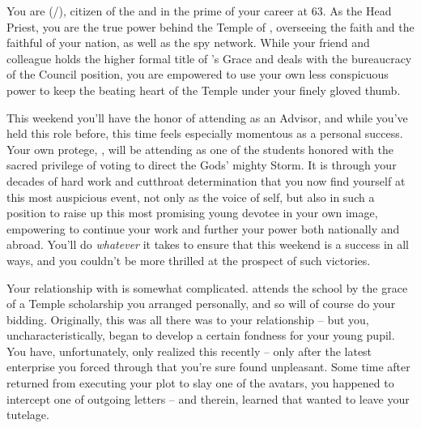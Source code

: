 \documentclass[char]{GL2020}
\begin{document}
\name{\cAntiChup{}}


You are \cAntiChup{\full} (\cAntiChup{\they}/\cAntiChup{\them}), citizen of the \pTech{} and in the prime of your career at 63.  As the Head Priest, you are the true power behind the Temple of \cTechGod{}, overseeing the faith and the faithful of your nation, as well as the \pTech{} spy network. While your friend and colleague \cCouncilPriest{} holds the higher formal title of \cTechGod{}’s Grace and deals with the bureaucracy of the Council position, you are empowered to use your own less conspicuous power to keep the beating heart of the Temple under your finely gloved thumb. 

This weekend you’ll have the honor of attending \pSchool{} as an Advisor, and while you’ve held this role before, this time feels especially momentous as a personal success. Your own protege, \cScholarship{}, will be attending as one of the students honored with the sacred privilege of voting to direct the Gods’ mighty Storm. It is through your decades of hard work and cutthroat determination that you now find yourself at this most auspicious event, not only as the voice of \cTechGod{} \cTechGod{\them}self, but also in such a position to raise up this most promising young devotee in your own image, empowering \cScholarship{\them} to continue your work and further your power both nationally and abroad. You’ll do \emph{whatever} it takes to ensure that this weekend is a success in all ways, and you couldn’t be more thrilled at the prospect of such victories.  

Your relationship with \cScholarship{} is somewhat complicated. \cScholarship{} attends the school by the grace of a Temple scholarship you arranged personally, and so will of course do your bidding. Originally, this was all there was to your relationship -- but you, uncharacteristically, began to develop a certain fondness for your young pupil. You have, unfortunately, only realized this recently -- only after the latest enterprise you forced \cScholarship{\them} through that you’re sure \cScholarship{\they} found unpleasant. Some time after \cScholarship{} returned from executing your plot to slay one of the \pShip{} avatars, you happened to intercept one of \cScholarship{\their} outgoing letters -- and therein, learned that \cScholarship{} wanted to leave your tutelage. 
\end{document}
